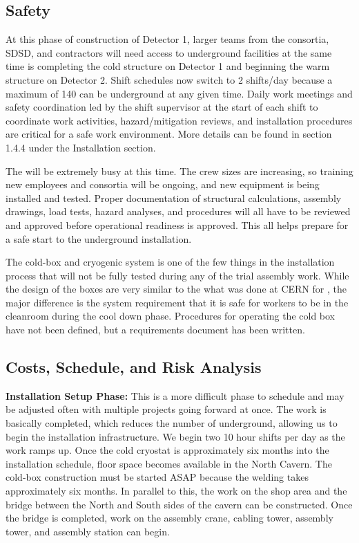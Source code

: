 \subsection{Safety}
\label{sec:fdsp-tc-infr-safety}
At this phase of construction of Detector 1, larger teams from the consortia, SDSD,  and contractors will need access to underground facilities at the same time  is completing the cold structure on Detector 1 and beginning the warm structure on Detector 2. Shift schedules now switch to 2 shifts/day because a maximum of 140  can be underground at any given time.  Daily work meetings and safety coordination led by the shift supervisor at the start of each shift to coordinate work activities, hazard/mitigation reviews, and installation procedures are critical for a safe work environment. More details can be found in section 1.4.4 under the Installation  section. 

The  will be extremely busy at this time. The crew sizes are increasing, so training new employees and consortia will be ongoing, and new equipment is being installed and tested. Proper documentation of structural calculations, assembly drawings, load tests, hazard analyses, and procedures will all have to be reviewed and approved before operational readiness is approved. This all helps prepare for a safe start to the underground installation. 

The cold-box and cryogenic system is one of the few things in the installation process that will not be fully tested during any of the trial assembly work. While the design of the boxes are very similar to the what was done at CERN for , the major difference is the system requirement that it is safe for workers to be in the cleanroom during the cool down phase. Procedures for operating the cold box have not been defined, but a requirements document has been written.   

\subsection{Costs, Schedule, and Risk Analysis}
\label{sec:fdsp-tc-infr-cost}


{\bf Installation Setup Phase:} This is a more difficult phase to schedule and may be adjusted often with multiple projects going forward at once. The  work is basically completed, which reduces the number of  underground, allowing us to begin the installation infrastructure. We begin two 10 hour shifts per day as the work ramps up.  Once the cold cryostat is approximately six months into the installation schedule, floor space becomes available in the North Cavern. The cold-box construction must be started ASAP because the welding takes approximately six months. In parallel to this, the work on the shop area and the bridge between the North and South sides of the cavern can be constructed.  Once the bridge is completed, work on the assembly crane,  cabling tower,  assembly tower, and  assembly station can begin. 
    
